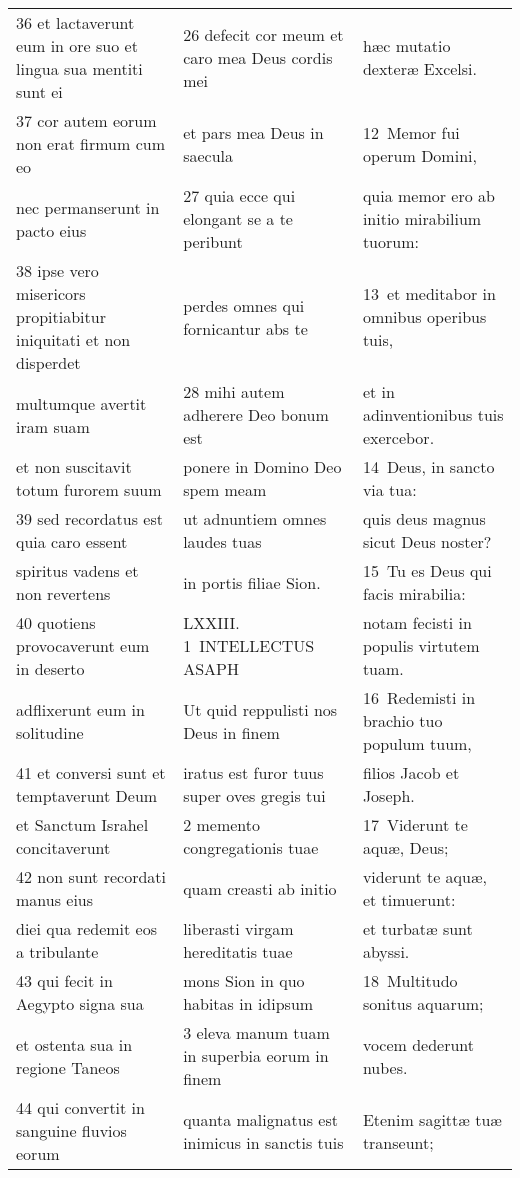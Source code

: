 \documentclass{article}
\begin{document}
\begin{longtable}{@{}p{}p{}p{}@{}}
36 et lactaverunt eum in ore suo et lingua sua mentiti sunt ei	&	26 defecit cor meum et caro mea Deus cordis mei	&	hæc mutatio dexteræ Excelsi.	\\
37 cor autem eorum non erat firmum cum eo	&	et pars mea Deus in saecula	&	12 Memor fui operum Domini,	\\
nec permanserunt in pacto eius	&	27 quia ecce qui elongant se a te peribunt	&	quia memor ero ab initio mirabilium tuorum:	\\
38 ipse vero misericors propitiabitur iniquitati et non disperdet	&	perdes omnes qui fornicantur abs te	&	13 et meditabor in omnibus operibus tuis,	\\
multumque avertit iram suam	&	28 mihi autem adherere Deo bonum est	&	et in adinventionibus tuis exercebor.	\\
et non suscitavit totum furorem suum	&	ponere in Domino Deo spem meam	&	14 Deus, in sancto via tua:	\\
39 sed recordatus est quia caro essent	&	ut adnuntiem omnes laudes tuas	&	quis deus magnus sicut Deus noster?	\\
spiritus vadens et non revertens	&	in portis filiae Sion.	&	15 Tu es Deus qui facis mirabilia:	\\
40 quotiens provocaverunt eum in deserto	&	LXXIII. 1 INTELLECTUS ASAPH	&	notam fecisti in populis virtutem tuam.	\\
adflixerunt eum in solitudine	&	Ut quid reppulisti nos Deus in finem	&	16 Redemisti in brachio tuo populum tuum,	\\
41 et conversi sunt et temptaverunt Deum	&	iratus est furor tuus super oves gregis tui	&	filios Jacob et Joseph.	\\
et Sanctum Israhel concitaverunt	&	2 memento congregationis tuae	&	17 Viderunt te aquæ, Deus;	\\
42 non sunt recordati manus eius	&	quam creasti ab initio	&	viderunt te aquæ, et timuerunt:	\\
diei qua redemit eos a tribulante	&	liberasti virgam hereditatis tuae	&	et turbatæ sunt abyssi.	\\
43 qui fecit in Aegypto signa sua	&	mons Sion in quo habitas in idipsum	&	18 Multitudo sonitus aquarum;	\\
et ostenta sua in regione Taneos	&	3 eleva manum tuam in superbia eorum in finem	&	vocem dederunt nubes.	\\
44 qui convertit in sanguine fluvios eorum	&	quanta malignatus est inimicus in sanctis tuis	&	Etenim sagittæ tuæ transeunt;	\\

\end{longtable}
\end{document}
